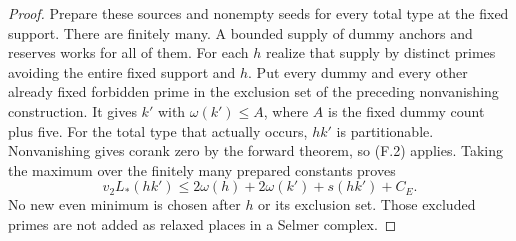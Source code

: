 \documentclass[11pt]{article}
\theoremstyle{definition}
\theoremstyle{remark}
\begin{document}
\begin{proof}
Prepare these sources and nonempty seeds for every total type at
the fixed support. There are finitely many. A bounded supply of
dummy anchors and reserves works for all of them. For each $h$
realize that supply by distinct primes avoiding the entire fixed
support and $h$. Put every dummy and every other already fixed
forbidden prime in the exclusion set of the preceding
nonvanishing construction. It gives $k'$ with
$\omega(k')\le A$, where $A$ is the fixed dummy count plus five.
For the total type that actually occurs, $hk'$ is partitionable.
Nonvanishing gives corank zero by the forward theorem, so (F.2)
applies. Taking the maximum over the finitely many prepared
constants proves
\[
 v_2L_*(hk')\le2\omega(h)+2\omega(k')+s(hk')+C_E.                 \tag{F.3}
\]
No new even minimum is chosen after $h$ or its exclusion set.
Those excluded primes are not added as relaxed places in a
Selmer complex.
\end{proof}
\end{document}

